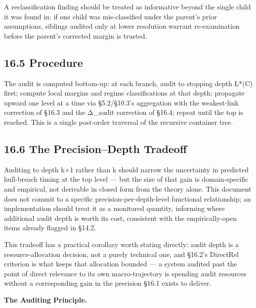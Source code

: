 \documentclass[
]{article}
\begin{document}
A reclassification finding should be treated as informative beyond the
single child it was found in: if one child was mis-classified under the
parent's prior assumptions, siblings audited only at lower resolution
warrant re-examination before the parent's corrected margin is trusted.

\hypertarget{procedure}{%
\subsection{16.5 Procedure}\label{procedure}}

The audit is computed bottom-up: at each branch, audit to stopping depth
L*(C) first; compute local margins and regime classifications at that
depth; propagate upward one level at a time via §5.2/§10.3's aggregation
with the weakest-link correction of §16.3 and the Δ\_audit correction of
§16.4; repeat until the top is reached. This is a single post-order
traversal of the recursive container tree.

\hypertarget{the-precisiondepth-tradeoff}{%
\subsection{16.6 The Precision--Depth
Tradeoff}\label{the-precisiondepth-tradeoff}}

Auditing to depth k+1 rather than k should narrow the uncertainty in
predicted hull-breach timing at the top level --- but the size of that
gain is domain-specific and empirical, not derivable in closed form from
the theory alone. This document does not commit to a specific
precision-per-depth-level functional relationship; an implementation
should treat it as a monitored quantity, informing where additional
audit depth is worth its cost, consistent with the empirically-open
items already flagged in §14.2.

This tradeoff has a practical corollary worth stating directly: audit
depth is a resource-allocation decision, not a purely technical one, and
§16.2's DirectRel criterion is what keeps that allocation bounded --- a
system audited past the point of direct relevance to its own
macro-trajectory is spending audit resources without a corresponding
gain in the precision §16.1 exists to deliver.

\textbf{The Auditing Principle.}
\end{document}
